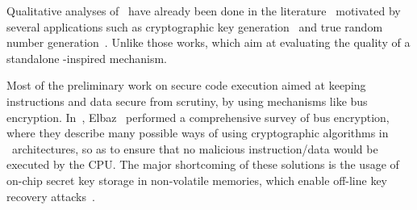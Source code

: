  



Qualitative analyses of \pufs~have already been done in the literature~\cite{Katzenbeisser2012} motivated by several applications such as cryptographic key generation~\cite{Suh2007, Bhargava2014} and true random number generation~\cite{Leest2012, Herrewege2013}. Unlike those works, which aim at evaluating the quality of a standalone \puf-inspired mechanism. %

Most of the preliminary work on secure code execution aimed at keeping instructions and data secure from scrutiny, by using mechanisms like bus encryption. In~\cite{Elbaz2005}, Elbaz \etal~performed a comprehensive survey of bus encryption, where they describe many possible ways of using cryptographic algorithms in \soc~architectures, so as to ensure that no malicious instruction\slash{}data would be executed by the CPU. The major shortcoming of these solutions is the usage of on-chip secret key storage in non-volatile memories, which enable off-line key recovery attacks~\cite{towardshardwaresecurity2010}.

